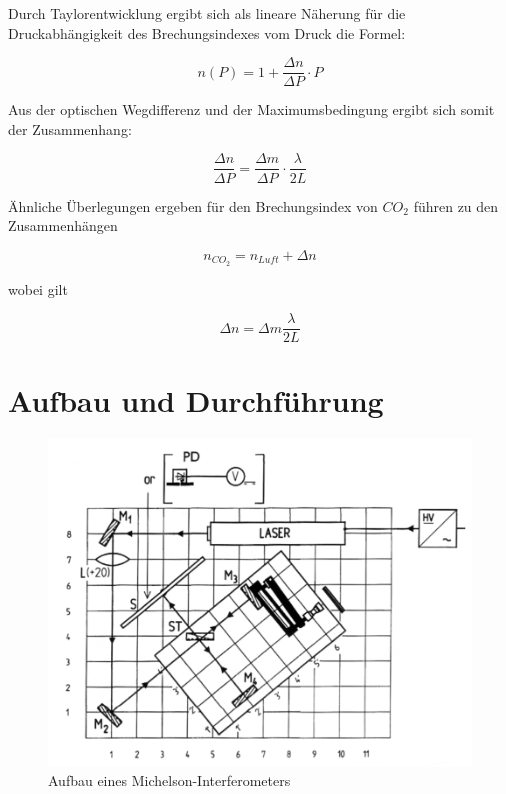 \documentclass[12pt,a4paper]{article}
\begin{document}
Durch Taylorentwicklung ergibt sich als lineare Näherung für die Druckabhängigkeit des Brechungsindexes vom Druck die Formel:

\begin{equation}
n(P) = 1+\frac{\Delta n}{\Delta P} \cdot P
\label{eq:DruckBrechzahl}
\end{equation}

Aus der optischen Wegdifferenz und der Maximumsbedingung ergibt sich somit der Zusammenhang:

\begin{equation}
\frac{\Delta n}{\Delta P} = \frac{\Delta m}{\Delta P} \cdot  \frac{\lambda}{2L}
\label{equ:DruckBrechung}
\end{equation}

Ähnliche Überlegungen ergeben für den Brechungsindex von $CO_2$ führen zu den Zusammenhängen

\begin{equation}
n_{CO_2} = n_{Luft} + \Delta n
\label{eq:COO_n}
\end{equation}

wobei gilt

\begin{equation}
\Delta n = \Delta m \frac{\lambda}{2L}
\label{eq:COO_dn}
\end{equation}



\section{Aufbau und Durchführung}

\begin{figure}
\centering
\includegraphics[scale=0.6]{Bilder/Aufbau}
\caption{Aufbau eines Michelson-Interferometers}
\label{fig:Aufbau}
\end{figure}
\end{document}
